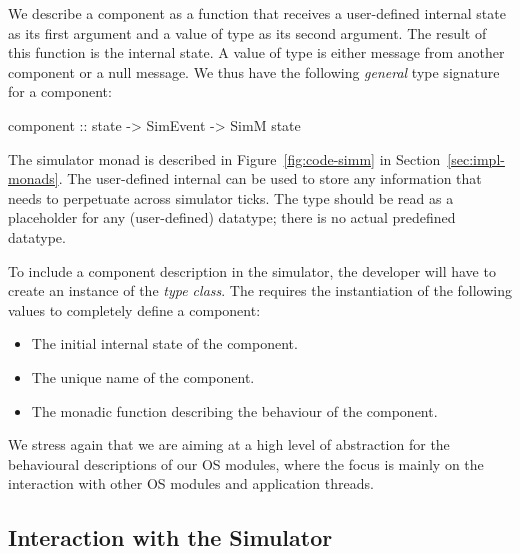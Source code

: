 We describe a component as a function that receives a user-defined internal state as its first argument and a value of type  as its second argument.
The result of this function is the internal state.
A value of type  is either message from another component or a null message.
We thus have the following \emph{general} type signature for a component:
\begin{code}
component :: state -> SimEvent -> SimM state
\end{code}

The simulator monad  is described in Figure~\ref{fig:code-simm} in Section~\ref{sec:impl-monads}.
The user-defined internal  can be used to store any information that needs to perpetuate across simulator ticks.
The type  should be read as a placeholder for any (user-defined) datatype; there is no actual predefined  datatype.

To include a component description in the simulator, the developer will have to create an instance of the  \emph{type class}.
The  requires the instantiation of the following values to completely define a component:

\begin{itemize}
  \item The initial internal state of the component.
  \item The unique name of the component.
  \item The monadic function describing the behaviour of the component.
\end{itemize}

We stress again that we are aiming at a high level of abstraction for the behavioural descriptions of our OS modules, where the focus is mainly on the interaction with other OS modules and application threads.


\subsection{Interaction with the Simulator}

%
%

